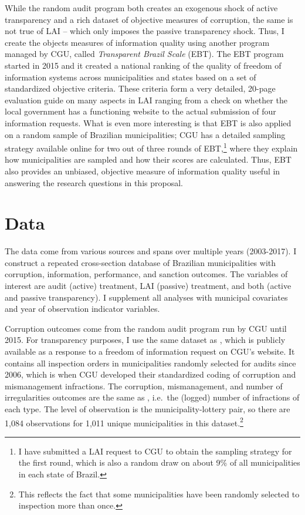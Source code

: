\documentclass[11pt]{article}
\begin{document}
While the random audit program both creates an exogenous shock of active transparency and a rich dataset of objective measures of corruption, the same is not true of LAI -- which only imposes the passive transparency shock. Thus, I create the objects measures of information quality using another program managed by CGU, called \emph{Transparent Brazil Scale} (EBT). The EBT program started in 2015 and it created a national ranking of the quality of freedom of information systems across municipalities and states based on a set of standardized objective criteria. These criteria form a very detailed, 20-page evaluation guide on many aspects in LAI ranging from a check on whether the local government has a functioning website to the actual submission of four information requests. What is even more interesting is that EBT is also applied on a random sample of Brazilian municipalities; CGU has a detailed sampling strategy available online for two out of three rounds of EBT,\footnote{I have submitted a LAI request to CGU to obtain the sampling strategy for the first round, which is also a random draw on about 9\% of all municipalities in each state of Brazil.} where they explain how municipalities are sampled and how their scores are calculated. Thus, EBT also provides an unbiased, objective measure of information quality useful in answering the research questions in this proposal.

\section{Data} \label{sec:data_paper3}

The data come from various sources and spans over multiple years (2003-2017). I construct a repeated cross-section database of Brazilian municipalities with corruption, information, performance, and sanction outcomes. The variables of interest are audit (active) treatment, LAI (passive) treatment, and both (active and passive transparency). I supplement all analyses with municipal covariates and year of observation indicator variables.

Corruption outcomes come from the random audit program run by CGU until 2015. For transparency purposes, I use the same dataset as \citet{AvisGovernmentAuditsReduce2018}, which is publicly available as a response to a freedom of information request on CGU's website. It contains all inspection orders in municipalities randomly selected for audits since 2006, which is when CGU developed their standardized coding of corruption and mismanagement infractions. The corruption, mismanagement, and number of irregularities outcomes are the same as \citet{AvisGovernmentAuditsReduce2018}, i.e.~the (logged) number of infractions of each type. The level of observation is the municipality-lottery pair, so there are 1,084 observations for 1,011 unique municipalities in this dataset.\footnote{This reflects the fact that some municipalities have been randomly selected to inspection more than once.}
\end{document}
